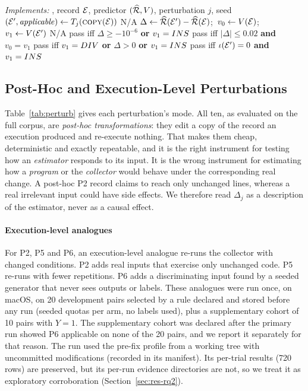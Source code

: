 \begin{algorithm}[!t]
\caption{\ers{} evaluation of one trial}
\label{alg:ers}
\small
\begin{algorithmic}[1]
\Statex \textit{Implements:} , 
\Require record $\mathcal{E}$, predictor $(\widehat{\mathcal{R}},V)$, perturbation $j$, seed
\State $(\mathcal{E}',\mathit{applicable})\gets T_j(\textsc{copy}(\mathcal{E}))$ 
 \Return N/A \EndIf
\State $\Delta\gets\widehat{\mathcal{R}}(\mathcal{E}')-\widehat{\mathcal{R}}(\mathcal{E})$;\ $v_0\gets V(\mathcal{E})$;\ $v_1\gets V(\mathcal{E}')$
   \Return N/A \EndIf
  \State \Return pass iff $\Delta\ge-10^{-6}$ \textbf{or} $v_1=INS{}$
 \Return pass iff $|\Delta|\le0.02$ \textbf{and} $v_0=v_1$
 \Return pass iff $v_1=DIV{}$ \textbf{or} $\Delta>0$ \textbf{or} $v_1=INS{}$
\Else{} \Return pass iff $\iota(\mathcal{E}')=0$ \textbf{and} $v_1=INS{}$ 
\EndIf
\end{algorithmic}
\end{algorithm}

\subsection{Post-Hoc and Execution-Level Perturbations}
Table~\ref{tab:perturb} gives each perturbation's mode. All ten, as evaluated on the full corpus, are \emph{post-hoc transformations}: they edit a copy of the record an execution produced and re-execute nothing. That makes them cheap, deterministic and exactly repeatable, and it is the right instrument for testing how an \emph{estimator} responds to its input. It is the wrong instrument for estimating how a \emph{program} or the \emph{collector} would behave under the corresponding real change. A post-hoc P2 record claims to reach only unchanged lines, whereas a real irrelevant input could have side effects. We therefore read $\Delta_j$ as a description of the estimator, never as a causal effect.


\paragraph*{Execution-level analogues} For P2, P5 and P6, an execution-level analogue re-runs the collector with changed conditions. P2 adds real inputs that exercise only unchanged code. P5 re-runs with fewer repetitions. P6 adds a discriminating input found by a seeded generator that never sees outputs or labels. These analogues were run once, on macOS, on 20 development pairs selected by a rule declared and stored before any run (seeded quotas per arm, no labels used), plus a supplementary cohort of 10 pairs with $Y{=}1$. The supplementary cohort was declared after the primary run showed P6 applicable on none of the 20 pairs, and we report it separately for that reason. The run used the pre-fix profile from a working tree with uncommitted modifications (recorded in its manifest). Its per-trial results (720 rows) are preserved, but its per-run evidence directories are not, so we treat it as exploratory corroboration (Section~\ref{sec:res-rq2}).

